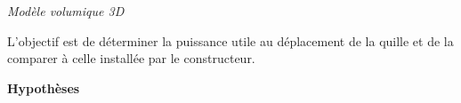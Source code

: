 \begin{multicols}{2}
\begin{center}
\textit{Modèle volumique 3D}
\end{center}




\fi
\begin{obj}
L’objectif est de déterminer la puissance utile au déplacement de la quille et de la comparer à celle installée
par le constructeur.
\end{obj}

\ifprof
\else
%



\textbf{Hypothèses}


\end{multicols}
